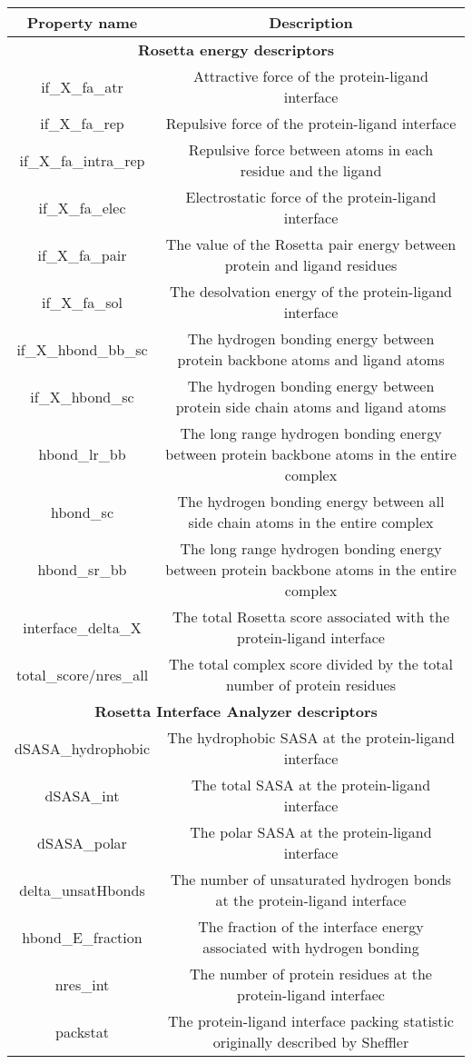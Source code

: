\begin{tabular}{|c|c|}
\hline
Property name & Description \\
\hline
\multicolumn{2}{|c|}{\textbf{Rosetta energy descriptors}} \\
\hline
if\_X\_fa\_atr & Attractive force of the protein-ligand interface\\
\hline
if\_X\_fa\_rep & Repulsive force of the protein-ligand interface\\
\hline
if\_X\_fa\_intra\_rep & Repulsive force between atoms in each residue and the ligand \\
\hline
if\_X\_fa\_elec & Electrostatic force of the protein-ligand interface \\
\hline
if\_X\_fa\_pair & The value of the Rosetta pair energy between protein and ligand residues\\
\hline
if\_X\_fa\_sol & The desolvation energy of the protein-ligand interface \\
\hline
if\_X\_hbond\_bb\_sc & The hydrogen bonding energy between protein backbone atoms and ligand atoms \\
\hline
if\_X\_hbond\_sc & The hydrogen bonding energy between protein side chain atoms and ligand atoms \\
\hline
hbond\_lr\_bb & The long range hydrogen bonding energy between protein backbone atoms in the entire complex \\
\hline
hbond\_sc & The hydrogen bonding energy between all side chain atoms in the entire complex\\
\hline
hbond\_sr\_bb &  The long range hydrogen bonding energy between protein backbone atoms in the entire complex\\
\hline
interface\_delta\_X & The total Rosetta score associated with the protein-ligand interface\\
\hline
total\_score/nres\_all & The total complex score divided by the total number of protein residues \\
\hline
\multicolumn{2}{|c|}{\textbf{Rosetta Interface Analyzer descriptors}} \\
\hline
dSASA\_hydrophobic & The hydrophobic SASA at the protein-ligand interface  \\
\hline
dSASA\_int & The total SASA at the protein-ligand interface  \\
\hline
dSASA\_polar & The polar SASA at the protein-ligand interface \\
\hline
delta\_unsatHbonds & The number of unsaturated hydrogen bonds at the protein-ligand interface\\
\hline
hbond\_E\_fraction & The fraction of the interface energy associated with hydrogen bonding\\
\hline
nres\_int & The number of protein residues at the protein-ligand interfaec\\
\hline
packstat & The protein-ligand interface packing statistic originally described by Sheffler \citep{Sheffler:2009bd} \\
\hline
\end{tabular}